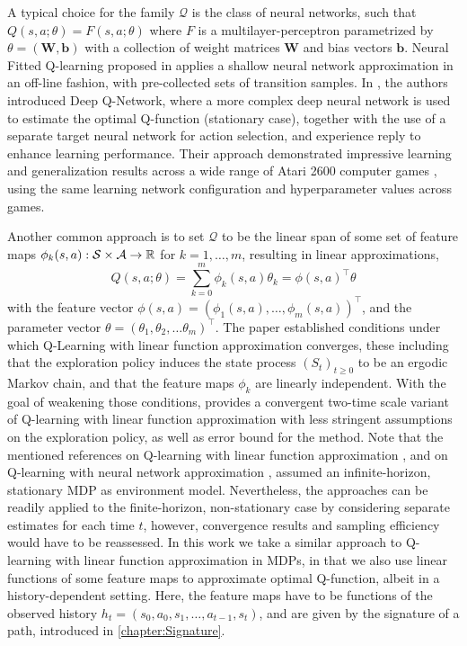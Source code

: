 \documentclass[
    a4paper,
    11pt,
    bibliography=totoc,
    listof=totoc,      
    headinclude=true,
    cleardoublepage=empty,
]{scrbook}
\theoremstyle{plain}
\theoremstyle{definition}
\theoremstyle{remark}
\newcommand{\SetR}{\mathbb R}
\newcommand{\SpaceS}{{\cal S}}
\newcommand{\SpaceA}{{\cal A}}
\begin{document}
A typical choice for the family $\mathcal{Q}$ is the class of neural networks,
such that $Q(s,a;\theta) = F(s,a;\theta)$ where $F$ is a
multilayer-perceptron parametrized by $\theta=(\bm{W},\bm{b})$ with a
collection of weight matrices $\bm{W}$ and bias vectors $\bm{b}$. Neural Fitted
Q-learning proposed in \cite{riedmiller2005_nfifewdenrlm} applies a shallow 
neural network approximation in an off-line fashion, with pre-collected sets 
of transition samples. In \cite{mnih2015_hctdrl}, the authors introduced Deep 
Q-Network, where a more complex deep neural network is used to estimate
the optimal Q-function (stationary case), together with the use of a separate 
target neural network for action selection, and experience reply to enhance 
learning performance. Their approach demonstrated impressive learning and 
generalization results across a wide range of Atari 2600 computer games 
\cite{bellemare2013_aleepga}, using the same learning network configuration 
and hyperparameter values across games.

Another common approach is to set $\mathcal{Q}$ to be the linear span of some
set of feature maps $\phi_k(s,a):\SpaceS\times\SpaceA\to\SetR$ for $k=1,
\dots,m$, resulting in linear approximations,
\[
    Q(s,a;\theta) 
    = \sum_{k=0}^m \phi_k(s,a)\theta_k
    = \phi(s,a)^\top \theta
\]
with the feature vector $\phi(s,a) = (\phi_1(s,a),\dots,\phi_m(s,a))^\top$, and the 
parameter vector $\theta = (\theta_1, \theta_2, \dots \theta_m)^\top$.
The paper \cite{melo2008_arlwfa} established conditions under which Q-Learning with 
linear function approximation converges, these including that the exploration 
policy induces the state process $(S_t)_{t\geq0}$ to be an ergodic Markov 
chain, and that the feature maps $\phi_k$ are linearly independent. With the
goal of weakening those conditions, \cite{carvalho2020_cvqwlfa} provides a 
convergent two-time scale variant of Q-learning with linear function 
approximation with less stringent assumptions on the exploration policy, as 
well as error bound for the method. Note that the mentioned references on
Q-learning with linear function approximation \cite{melo2008_arlwfa,%
carvalho2020_cvqwlfa}, and on Q-learning with neural network approximation 
\cite{mnih2015_hctdrl,riedmiller2005_nfifewdenrlm}, assumed an 
infinite-horizon, stationary MDP as environment model. Nevertheless, the 
approaches can be readily applied to the finite-horizon, non-stationary case 
by considering separate estimates for each time $t$, however, convergence 
results and sampling efficiency would have to be reassessed. In this work we 
take a similar approach to Q-learning with linear function approximation in 
MDPs, in that we also use linear functions of some feature maps to approximate 
optimal Q-function, albeit in a history-dependent setting. Here, the feature 
maps have to be functions of the observed history $h_t=(s_0, a_0, s_1, \dots, 
a_{t-1}, s_t)$, and are given by the signature of a path, introduced in 
\cref{chapter:Signature}.
\end{document}
